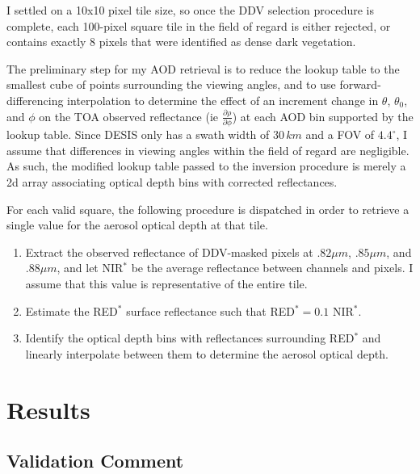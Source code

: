 \documentclass[12pt]{article}
\begin{document}
I settled on a 10x10 pixel tile size, so once the DDV selection procedure is complete, each 100-pixel square tile in the field of regard is either rejected, or contains exactly 8 pixels that were identified as dense dark vegetation.

The preliminary step for my AOD retrieval is to reduce the lookup table to the smallest cube of points surrounding the viewing angles, and to use forward-differencing interpolation to determine the effect of an increment change in $\theta$, $\theta_0$, and $\phi$ on the TOA observed reflectance (ie $\frac{\partial \rho}{\partial \phi}$) at each AOD bin supported by the lookup table. Since DESIS only has a swath width of $30\,\si{km}$ and a FOV of $4.4^\circ$, I assume that differences in viewing angles within the field of regard are negligible. As such, the modified lookup table passed to the inversion procedure is merely a 2d array associating optical depth bins with corrected reflectances.

For each valid square, the following procedure is dispatched in order to retrieve a single value for the aerosol optical depth at that tile.

\begin{enumerate}[itemsep=.0em]
    \item Extract the observed reflectance of DDV-masked pixels at $.82\mu m$, $.85\mu m$, and $.88\mu m$, and let NIR$^*$ be the average reflectance between channels and pixels. I assume that this value is representative of the entire tile.
    \item Estimate the RED$^*$ surface reflectance such that RED$^* = 0.1$ NIR$^*$.
    \item Identify the optical depth bins with reflectances surrounding RED$^*$ and linearly interpolate between them to determine the aerosol optical depth.
\end{enumerate}

\section{Results}

\subsection{Validation Comment}
\end{document}
